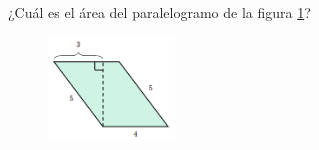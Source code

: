 \question[15]  ¿Cuál es el \'area del paralelogramo de la figura \ref{fig:area_compuesta_04}?
\begin{figure}[H]
    \begin{center}
        \includegraphics[width=0.3\textwidth]{../images/area_compuesta_04.png}
    \end{center}
    \caption{}
    \label{fig:area_compuesta_04}
\end{figure}